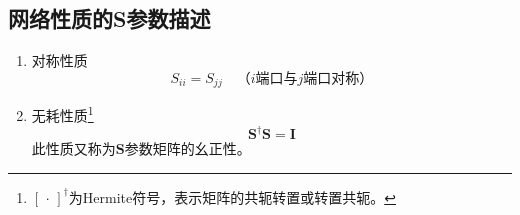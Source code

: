     \subsection{网络性质的S参数描述}
        \begin{enumerate}
            \item 对称性质
            \begin{equation}
                S_{ii}=S_{jj}\quad\mbox{（$i$端口与$j$端口对称）}
            \end{equation}
            \item 无耗性质\footnote{$[\,\cdot\,]^\dagger$为Hermite符号，表示矩阵的共轭转置或转置共轭。}
            \begin{equation}
                \bm{S}^\dagger\bm{S}=\bm{I}
            \end{equation}
            此性质又称为$\bm{S}$参数矩阵的幺正性。



\end{enumerate}

